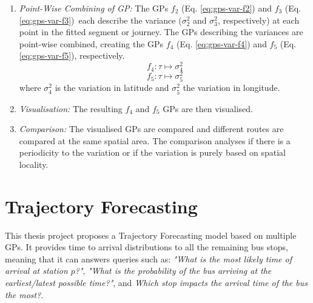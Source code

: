 \begin{enumerate}
    \item \textit{Point-Wise Combining of GP:}
    The GPs $f_2$ (Eq. \ref{eq:gps-var-f2}) and $f_3$ (Eq. \ref{eq:gps-var-f3}) each describe the variance ($\sigma_2^2$ and $\sigma_3^2$, respectively) at each point in the fitted segment or journey.
    The GPs describing the variances are point-wise combined, creating the GPs $f_4$ (Eq. \ref{eq:gps-var-f4}) and $f_5$ (Eq. \ref{eq:gps-var-f5}), respectively.
    \begin{equation} \label{eq:gps-var-f4}
        f_4: \tau \longmapsto \sigma_4^2
    \end{equation}
    \begin{equation} \label{eq:gps-var-f5}
        f_5: \tau \longmapsto \sigma_5^2
    \end{equation}
    where $\sigma_4^2$ is the variation in latitude and $\sigma_5^2$ the variation in longitude.

    \item \textit{Visualisation:}
    The resulting $f_4$ and $f_5$ GPs are then visualised. 

    \item \textit{Comparison:}
    The visualised GPs are compared and different routes are compared at the same spatial area.
    The comparison analyses if there is a periodicity to the variation or if the variation is purely based on spatial locality.
\end{enumerate}  

\section{Trajectory Forecasting}
This thesis project proposes a Trajectory Forecasting model based on multiple GPs.
It provides time to arrival distributions to all the remaining bus stops, meaning that it can answers queries such as:
\textit{"What is the most likely time of arrival at station $p$?"}, \textit{"What is the probability of the bus arriving at the earliest/latest possible time?"}, and \textit{Which stop impacts the arrival time of the bus the most?}.

